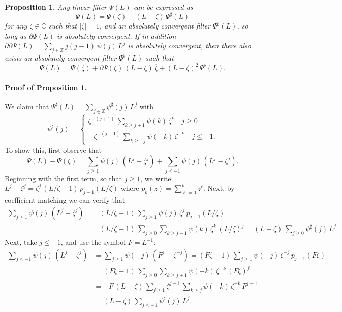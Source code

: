 \documentclass[a4paper]{book}
\def\ZZ{\mathbb Z}
\def\CC{\mathbb C}
\newtheorem{Proposition}{Proposition}
\begin{document}
\begin{Proposition}
\label{prop:filter-decompose}
 Any linear filter $\Psi (L)$ can be expressed as
\[
  \Psi (L) = \Psi (\zeta) + (L - \zeta) \, \Psi^{\sharp} (L)
\]
 for any $\zeta \in \CC$  such that $| \zeta | = 1$,
  and an absolutely convergent filter $\Psi^{\sharp} (L)$,
  so long as  $\partial \Psi (L) $ is absolutely convergent.
 If in addition $ \partial \partial \Psi (L) =
 \sum_{ j \in \ZZ} j (j-1) \, \psi (j) \, L^j$
   is absolutely convergent, then there also exists an absolutely
   convergent filter $\Psi^{\flat} (L)$  such that
\[
 \Psi (L) = \Psi (\zeta) + \partial \Psi (\zeta) \, 
 (L- \zeta) \, \overline{\zeta} + {(L - \zeta)}^2 \, \Psi^{\flat} (L).
\]
\end{Proposition}


\paragraph{Proof of Proposition \ref{prop:filter-decompose}.}
 We claim that $\Psi^{\sharp} (L) = \sum_{j \in \ZZ} \psi^{\sharp} (j) \, L^j$ with
\[
 \psi^{\sharp} (j) = \begin{cases}  {\zeta}^{-(j+1)} \,  
 \sum_{k \geq j+1} \psi (k) \, \zeta^k  \quad j \geq 0 \\
					-\zeta^{-(j+1)} \, \sum_{k \geq -j} \psi (-k) \,  
					{\zeta}^{-k} \quad j \leq -1.	
		\end{cases}
\]
To show this, first observe that 
\[
  \Psi (L) - \Psi (\zeta) = \sum_{j \geq 1} \psi (j) \, 
  (L^j - \zeta^j) + \sum_{j \leq -1} \psi (j) \, (L^j - \zeta^j).
\]
 Beginning with the first term, so that $j \geq 1$, we write 
 $L^j - \zeta^j = \zeta^j \, (L/\zeta - 1) \, p_{j-1} (L/\zeta)$
 where $p_k (z) = \sum_{\ell=0}^k z^{\ell}$.   Next, by coefficient
 matching we can verify that
\begin{align*}
   \sum_{j \geq 1} \psi (j) \, (L^j - \zeta^j) & = (L/\zeta - 1) \,
   \sum_{j \geq 1} \psi (j) \, \zeta^j \, p_{j-1} (L/\zeta) \\
 & = (L/\zeta -1) \, \sum_{j \geq 0}  \sum_{k \geq j+1} \psi (k) \,
 \zeta^k \, {(L/\zeta)}^{j}
 = (L - \zeta) \,  \sum_{j \geq 0}  \psi^{\sharp} (j) \, L^j.
\end{align*}
 Next, take $j \leq -1$, and use the symbol $F = L^{-1}$:
\begin{align*}
  \sum_{j \leq -1} \psi (j) \, (L^j - \zeta^j) & = \sum_{j \geq 1}
  \psi (-j) \, (F^j - \zeta^{-j}) 
   =   (F \zeta - 1) \, \sum_{j \geq 1} \psi (-j) \, \zeta^{-j} \, p_{j-1} (F \zeta) \\
 & =  (F \zeta - 1) \, \sum_{j \geq 0} \sum_{k \geq j+1}  
  \psi (-k) \, \zeta^{-k} \, {(F \zeta)}^{j}  \\
 &  =  - F\,  (L - \zeta ) \, \sum_{j \geq 1}  \zeta^{j-1} 
 \, \sum_{k \geq j}  \psi (-k) \, \zeta^{-k} \,  F^{j-1}  \\
 &= (L - \zeta) \, \sum_{j \leq -1}  \psi^{\sharp} (j) \, L^j.
\end{align*}
\end{document}

